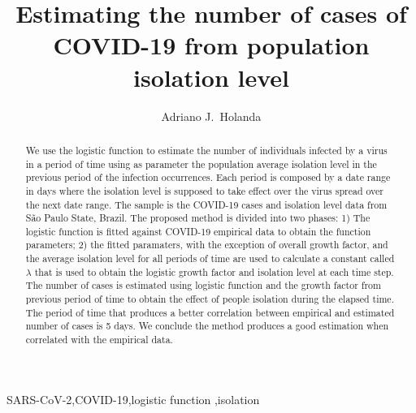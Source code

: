 \documentclass[review]{elsarticle}
\begin{document}
\begin{frontmatter}

\title{Estimating the number of cases of {COVID-19} from population isolation level}

\author[mymainaddress,mysecondaryaddress]{Adriano J.\ Holanda}

\address[mymainaddress]{Department of Computing and Mathematics - Faculty of Philosophy, Science and Letters at Ribeir\~{a}o Preto - University of S\~{a}o Paulo, Ribeirão Preto, S\~{a}o Paulo, Brazil}
\address[mysecondaryaddress]{Faculty ``Dr.\ Francisco Maeda'', Ituverava, São Paulo, Brazil}


\begin{abstract}
We use the logistic function to estimate the number 
of individuals infected by a virus in a period of time
using as parameter the population average isolation level 
in the previous period of the infection occurrences.
Each period is composed by a date range in days 
where the isolation level is supposed to take
effect over the virus spread over the next 
date range.
The sample is the \hbox{COVID-19} cases and 
isolation level data from S\~{a}o Paulo State, Brazil.  
The proposed method is divided into two phases: 
1) The logistic function is fitted against \hbox{COVID-19}
empirical data to obtain the function parameters; 
2) the fitted paramaters, 
with the exception of overall growth factor,
 and the average isolation level for all periods of time 
are used to calculate a constant called $\lambda$ 
that is used to obtain the logistic growth factor and
 isolation level at each time step.
 The number of cases is estimated using 
logistic function and the growth factor 
from previous period of time 
to obtain the effect of people isolation during the
elapsed time. 
The period of time that produces a 
better correlation between empirical and estimated 
number of cases is 5 days. 
We conclude the method produces a good 
estimation when correlated with the empirical data.
\end{abstract}

\begin{keyword}
\hbox{SARS-CoV-2}\sep \hbox{COVID-19}\sep logistic function \sep isolation
\end{keyword}

\end{frontmatter}
\end{document}

